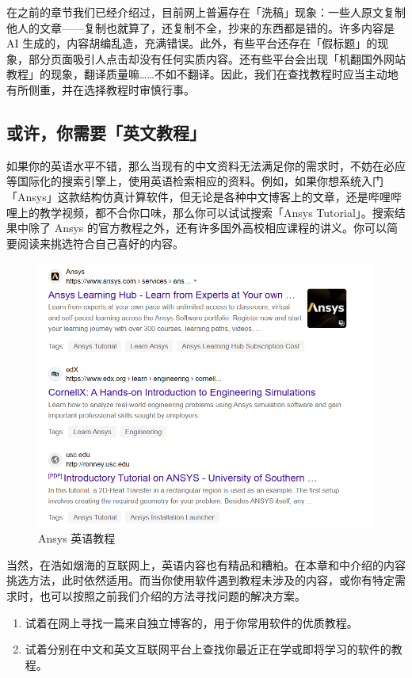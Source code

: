 在之前的章节我们已经介绍过，目前网上普遍存在「洗稿」现象：一些人原文复制他人的文章——复制也就算了，还复制不全，抄来的东西都是错的。许多内容是 AI 生成的，内容胡编乱造，充满错误。此外，有些平台还存在「假标题」的现象，部分页面吸引人点击却没有任何实质内容。还有些平台会出现「机翻国外网站教程」的现象，翻译质量嘛……不如不翻译。因此，我们在查找教程时应当主动地有所侧重，并在选择教程时审慎行事。

\subsection{或许，你需要「英文教程」}

如果你的英语水平不错，那么当现有的中文资料无法满足你的需求时，不妨在必应等国际化的搜索引擎上，使用英语检索相应的资料。例如，如果你想系统入门「Ansys」这款结构仿真计算软件，但无论是各种中文博客上的文章，还是哔哩哔哩上的教学视频，都不合你口味，那么你可以试试搜索「Ansys Tutorial」。搜索结果中除了 Ansys 的官方教程之外，还有许多国外高校相应课程的讲义。你可以简要阅读来挑选符合自己喜好的内容。

\begin{figure}[htb!]
  \centering
  \includegraphics[width=.6\textwidth]{assets/software/Ansys.png}
  \caption{Ansys 英语教程}
  \label{fig:Ansys}
\end{figure}

当然，在浩如烟海的互联网上，英语内容也有精品和糟粕。在本章和中介绍的内容挑选方法，此时依然适用。而当你使用软件遇到教程未涉及的内容，或你有特定需求时，也可以按照之前我们介绍的方法寻找问题的解决方案。

\practice

\begin{enumerate}
  \item 试着在网上寻找一篇来自独立博客的，用于你常用软件的优质教程。
  \item 试着分别在中文和英文互联网平台上查找你最近正在学或即将学习的软件的教程。
\end{enumerate}
